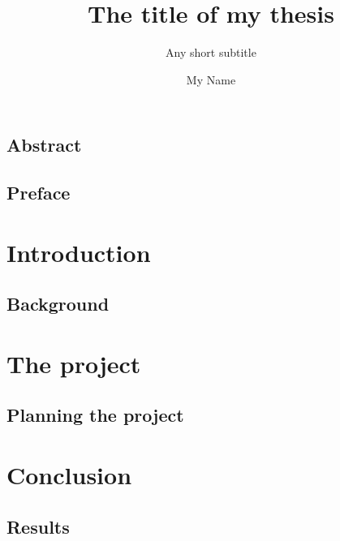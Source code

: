 \documentclass[UKenglish]{ifimaster}  %
\title{The title of my thesis}        %
\subtitle{Any short subtitle}         %
\author{My Name}                      %
\begin{document}
\duoforside[dept={Department of Informatics},   %
  program={Network and system administration},  %
  short]                                        %

\frontmatter{}

\chapter*{Abstract}                   %

\tableofcontents{}
\listoffigures{}
\listoftables{}

\chapter*{Preface}                    %

\mainmatter{}
\part{Introduction}                   %

\chapter{Background}                  %


\part{The project}                    %

\chapter{Planning the project}        %


\part{Conclusion}                     %

\chapter{Results}                     %


\backmatter{}
\printbibliography
\end{document}
